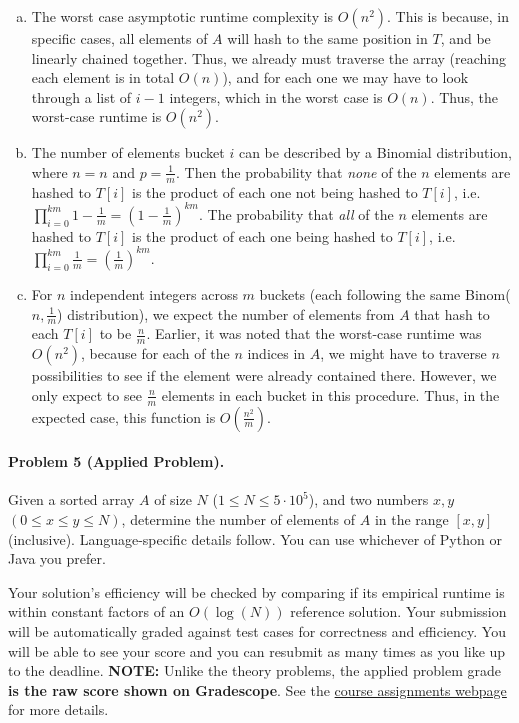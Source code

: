 \documentclass[11pt]{article}
\begin{document}
\begin{enumerate}[(a)]
	\item The worst case asymptotic runtime complexity is $O(n^2)$. This is because, in specific cases, all elements of $A$ will hash to the same position in $T$, and be linearly chained together. Thus, we already must traverse the array (reaching each element is in total $O(n)$), and for each one we may have to look through a list of $i - 1$ integers, which in the worst case is $O(n)$. Thus, the worst-case runtime is $O(n^2)$. 
	\item The number of elements bucket $i$ can be described by a Binomial distribution, where $n = n$ and $p = \frac{1}{m}$. Then the probability that \textit{none} of the $n$ elements are hashed to $T[i]$ is the product of each one not being hashed to $T[i]$, i.e. $\prod_{i = 0}^{km} 1 - \frac{1}{m} = (1 - \frac{1}{m})^{km}$. The probability that \textit{all} of the $n$ elements are hashed to $T[i]$ is the product of each one being hashed to $T[i]$, i.e. $\prod_{i = 0}^{km} \frac{1}{m} = (\frac{1}{m})^{km}$.
	\item For $n$ independent integers across $m$ buckets (each following the same Binom($n, \frac{1}{m}$) distribution), we expect the number of elements from $A$ that hash to each $T[i]$ to be $\frac{n}{m}$. Earlier, it was noted that the worst-case runtime was $O(n^2)$, because for each of the $n$ indices in $A$, we might have to traverse $n$ possibilities to see if the element were already contained there. However, we only expect to see $\frac{n}{m}$ elements in each bucket in this procedure. Thus, in the expected case, this function is $O(\frac{n^2}{m})$.
\end{enumerate}



\newpage
\paragraph{Problem 5 (Applied Problem).}
Given a sorted array $A$ of size $N$ ($1 \leq N \leq 5\cdot10^{5}$), and two numbers $x,y$ $(0 \leq x \leq y \leq N)$, determine the number of elements of $A$ in the range $[x,y]$ (inclusive). Language-specific details follow. You can use whichever of Python or Java you prefer.

Your solution's efficiency will be checked by comparing if its empirical runtime is within constant factors of an $O(\log(N))$ reference solution. Your submission will be automatically graded against test cases for correctness and efficiency. You will be able to see your score and you can resubmit as many times as you like up to the deadline. \textbf{NOTE:} Unlike the theory problems, the applied problem grade \textbf{is the raw score shown on Gradescope}. See the \href{https://sites.duke.edu/spring24compsci330/assignments/}{course assignments webpage} for more details. 
\end{document}
